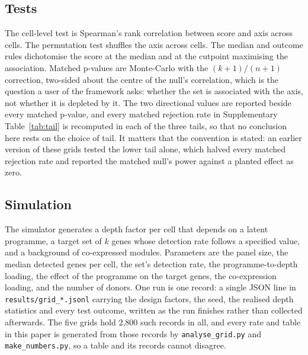 \documentclass[11pt]{article}
\newcommand{\code}[1]{\texttt{#1}}
\begin{document}
\subsection{Tests}
The cell-level test is Spearman's rank correlation \citep{spearman1904}
between score and axis across cells.
The permutation test shuffles the axis across cells. The median and outcome
rules dichotomise the score at the median and at the cutpoint maximising the
association. Matched p-values are Monte-Carlo with the $(k+1)/(n+1)$
correction, two-sided about the centre of the null's correlation, which is the
question a user of the framework asks: whether the set is associated with the
axis, not whether it is depleted by it. The two directional values are reported
beside every matched p-value, and every matched rejection rate in
Supplementary Table~\ref{tab:tail} is recomputed in each of the three tails, so
that no conclusion here rests on the choice of tail. It matters that the
convention is stated: an earlier version of these grids tested the lower tail
alone, which halved every matched rejection rate and reported the matched
null's power against a planted effect as zero.

\subsection{Simulation}
The simulator generates a depth factor per cell that depends on a latent
programme, a target set of $k$ genes whose detection rate follows a specified
value, and a background of co-expressed modules. Parameters are the panel size,
the median detected genes per cell, the set's detection rate, the
programme-to-depth loading, the effect of the programme on the target genes, the
co-expression loading, and the number of donors. One run is one record: a
single JSON line in \code{results/grid\_*.jsonl} carrying the design factors,
the seed, the realised depth statistics and every test outcome, written as the
run finishes rather than collected afterwards. The five grids hold 2{,}800
such records in all, and every rate and table in this paper is generated from
those records by \code{analyse\_grid.py} and \code{make\_numbers.py}, so a
table and its records cannot disagree.
\end{document}
